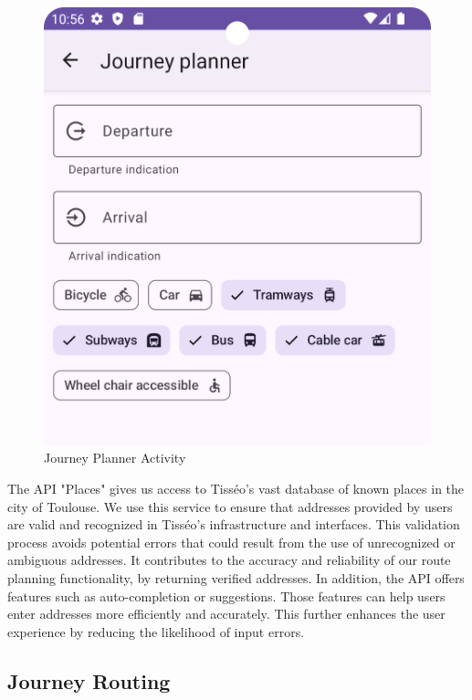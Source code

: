\begin{figure}[h]
    \centering
    \includegraphics[scale=0.20]{img/journey.png}
    \caption{Journey Planner Activity}
    \label{fig:JourneyPlanner}
\end{figure}


The API "Places" gives us access to Tisséo's vast database of known places in the city of Toulouse. We use this service to ensure that addresses provided by users are valid and recognized in Tisséo's infrastructure and interfaces. This validation process avoids potential errors that could result from the use of unrecognized or ambiguous addresses. It contributes to the accuracy and reliability of our route planning functionality, by returning verified addresses. In addition, the API offers features such as auto-completion or suggestions. Those features can help users enter addresses more efficiently and accurately. This further enhances the user experience by reducing the likelihood of input errors.


\subsection{Journey Routing}


